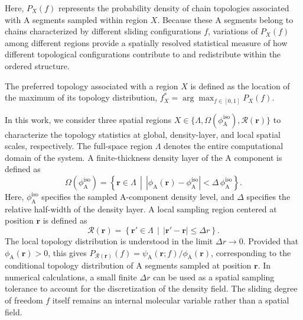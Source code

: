    
    Here, $P_X(f)$ represents the probability density of chain topologies associated with A segments sampled within region $X$. 
    Because these A segments belong to chains characterized by different sliding configurations $f$, variations of $P_X(f)$ among different regions provide a spatially resolved statistical measure of how different topological configurations contribute to and redistribute within the ordered structure.
    
    The preferred topology associated with a region $X$ is defined as the location of the maximum of its topology distribution, $f_X^\ast=\arg\max_{f\in[0,1]}P_X(f)$.
    


    In this work, we consider three spatial regions $X\in\{\Lambda,\Omega(\phi_{\mathrm A}^{\mathrm{iso}}),\mathcal R(\bm r)\}$ to characterize the topology statistics at global, density-layer, and local spatial scales, respectively.
    The full-space region $\Lambda$ denotes the entire computational domain of the system.
    A finite-thickness density layer of the A component is defined as
    \begin{equation}
        \Omega(\phi_{\mathrm A}^{\mathrm{iso}})
        =
        \left\{
            \bm r\in\Lambda
            \,\middle|\,
            \left|\phi_{\mathrm A}(\bm r)-\phi_{\mathrm A}^{\mathrm{iso}}\right|
            <
            \Delta\,\phi_{\mathrm A}^{\mathrm{iso}}
        \right\}.
        \label{eq:IsodensityRegion}
    \end{equation}
    Here, $\phi_{\mathrm A}^{\mathrm{iso}}$ specifies the sampled A-component density level, and $\Delta$ specifies the relative half-width of the density layer.
    A local sampling region centered at position $\bm r$ is defined as
    \begin{equation}
        \mathcal R(\bm r)
        =
        \left\{
            \bm r'\in\Lambda
            \,\middle|\,
            \left|\bm r'-\bm r\right|
            \leq \Delta r
        \right\}.
        \label{eq:LocalRegion}
    \end{equation}
    The local topology distribution is understood in the limit $\Delta r\to0$.
    Provided that $\phi_{\mathrm A}(\bm r)>0$, this gives $P_{\mathcal R(\bm r)}(f)=\psi_{\mathrm A}(\bm r;f)/\phi_{\mathrm A}(\bm r)$, corresponding to the conditional topology distribution of A segments sampled at position $\bm r$.
    In numerical calculations, a small finite $\Delta r$ can be used as a spatial sampling tolerance to account for the discretization of the density field.
    The sliding degree of freedom $f$ itself remains an internal molecular variable rather than a spatial field.


